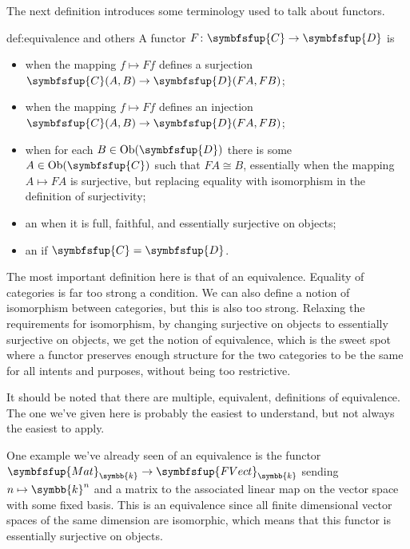 \documentclass[fleqn]{NotesClass}
\makeatletter
\newcommand{\cat}[1]{\symbfsfup{#1}}
\newcommand{\c@egory}[1]{\symbfsfup{#1}}
\renewcommand{\field}{\symbb{k}}
\newcommand{\Mat}[1][\field]{{\c@egory{Mat}_{#1}}}
\newcommand{\FVect}[1][\field]{{\c@egory{FVect}_{#1}}}
\DeclareMathOperator{\Ob}{Ob}
\newcommand{\isomorphic}{\cong}
\makeatother
\begin{document}
    The next definition introduces some terminology used to talk about functors.
    
    \begin{dfn}{}{def:equivalence and others}
        A functor \(F \colon \cat{C} \to \cat{D}\) is
        \begin{itemize}
            \item {} when the mapping \(f \mapsto Ff\) defines a surjection \(\cat{C}(A, B) \to \cat{D}(FA, FB)\);
            \item {} when the mapping \(f \mapsto Ff\) defines an injection \(\cat{C}(A, B) \to \cat{D}(FA, FB)\);
            \item {} when for each \(B \in \Ob(\cat{D})\) there is some \(A \in \Ob(\cat{C})\) such that \(FA \isomorphic B\), essentially when the mapping \(A \mapsto FA\) is surjective, but replacing equality with isomorphism in the definition of surjectivity;
            \item an  when it is full, faithful, and essentially surjective on objects;
            \item an  if \(\cat{C} = \cat{D}\).
        \end{itemize}
    \end{dfn}
    
    The most important definition here is that of an equivalence.
    Equality of categories is far too strong a condition.
    We can also define a notion of isomorphism between categories, but this is also too strong.
    Relaxing the requirements for isomorphism, by changing surjective on objects to essentially surjective on objects, we get the notion of equivalence, which is the sweet spot where a functor preserves enough structure for the two categories to be the same for all intents and purposes, without being too restrictive.
    
    It should be noted that there are multiple, equivalent, definitions of equivalence.
    The one we've given here is probably the easiest to understand, but not always the easiest to apply.
    
    One example we've already seen of an equivalence is the functor \(\Mat \to \FVect\) sending \(n \mapsto \field^n\) and a matrix to the associated linear map on the vector space with some fixed basis.
    This is an equivalence since all finite dimensional vector spaces of the same dimension are isomorphic, which means that this functor is essentially surjective on objects.
    
\end{document}
